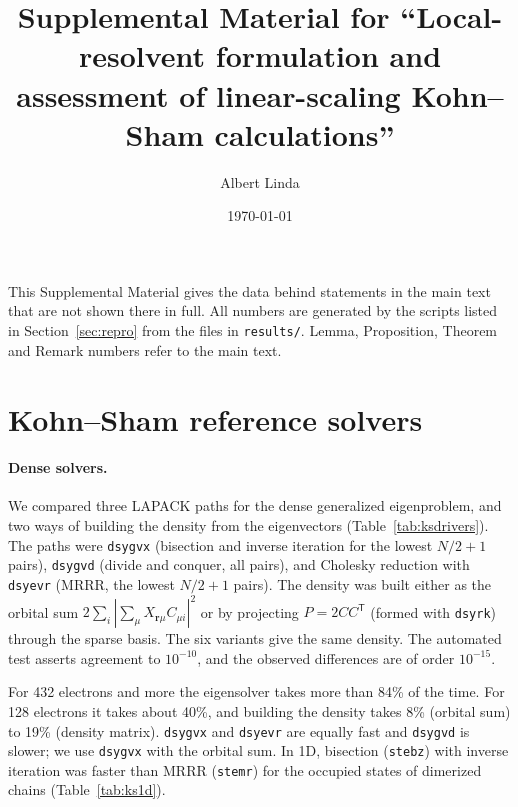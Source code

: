 \documentclass[aps,prb,onecolumn,superscriptaddress,floatfix]{revtex4-2}
\begin{document}
\title{Supplemental Material for ``Local-resolvent formulation and assessment of linear-scaling Kohn--Sham calculations''}
\author{Albert Linda}
\date{\today}
\maketitle

This Supplemental Material gives the data behind statements in the main text that are not shown there in full. All
numbers are generated by the scripts listed in Section~\ref{sec:repro} from the files in \texttt{results/}. Lemma,
Proposition, Theorem and Remark numbers refer to the main text.

\section{Kohn--Sham reference solvers}\label{sec:ks}

\paragraph*{Dense solvers.} We compared three LAPACK paths for the dense generalized eigenproblem, and two ways of building
the density from the eigenvectors (Table~\ref{tab:ksdrivers}). The paths were \texttt{dsygvx} (bisection and inverse
iteration for the lowest $N/2+1$ pairs), \texttt{dsygvd} (divide and conquer, all pairs), and Cholesky reduction with
\texttt{dsyevr} (MRRR, the lowest $N/2+1$ pairs). The density was built either as the orbital sum
$2\sum_i|\sum_\mu X_{\bm r\mu}C_{\mu i}|^2$ or by projecting $P=2CC^{\mathsf T}$ (formed with \texttt{dsyrk}) through the sparse
basis. The six variants give the same density. The automated test asserts agreement to $10^{-10}$, and the observed
differences are of order $10^{-15}$.

For 432 electrons and more the eigensolver takes more than 84\% of the time. For 128
electrons it takes about 40\%, and building the density takes 8\% (orbital sum) to 19\% (density matrix).
\texttt{dsygvx} and \texttt{dsyevr} are equally fast and \texttt{dsygvd} is slower; we use \texttt{dsygvx} with the orbital
sum. In 1D, bisection (\texttt{stebz}) with inverse iteration was faster than MRRR (\texttt{stemr}) for the occupied states
of dimerized chains (Table~\ref{tab:ks1d}).
\end{document}

